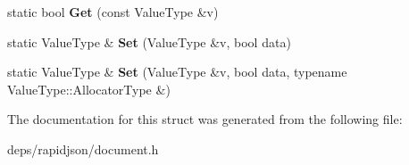 \begin{DoxyCompactItemize}
\item 
static bool {\bfseries Get} (const Value\+Type \&v)\hypertarget{structinternal_1_1_type_helper_3_01_value_type_00_01bool_01_4_aed612b233e5985d049248b414fb0034a}{}\label{structinternal_1_1_type_helper_3_01_value_type_00_01bool_01_4_aed612b233e5985d049248b414fb0034a}

\item 
static Value\+Type \& {\bfseries Set} (Value\+Type \&v, bool data)\hypertarget{structinternal_1_1_type_helper_3_01_value_type_00_01bool_01_4_a4bfa644e57e7d725468ed78103c1579a}{}\label{structinternal_1_1_type_helper_3_01_value_type_00_01bool_01_4_a4bfa644e57e7d725468ed78103c1579a}

\item 
static Value\+Type \& {\bfseries Set} (Value\+Type \&v, bool data, typename Value\+Type\+::\+Allocator\+Type \&)\hypertarget{structinternal_1_1_type_helper_3_01_value_type_00_01bool_01_4_a01a2bdf4117fb767c8d703be9e0f5f1d}{}\label{structinternal_1_1_type_helper_3_01_value_type_00_01bool_01_4_a01a2bdf4117fb767c8d703be9e0f5f1d}

\end{DoxyCompactItemize}


The documentation for this struct was generated from the following file\+:\begin{DoxyCompactItemize}
\item 
deps/rapidjson/document.\+h\end{DoxyCompactItemize}
